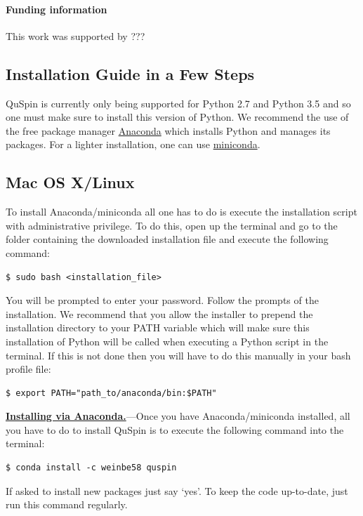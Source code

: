 \documentclass{SciPost}
\newcommand\0{\scalebox{-1}[1]{0}}
\let\svttfamily\ttfamily
\renewcommand\ttfamily{\svttfamily\catcode`0=\active }
\begin{document}
\paragraph{Funding information}
This work was supported by ???
\begin{appendix}
	
\section{Installation Guide in a Few Steps}
	\label{app:install}
	
	QuSpin is currently only being supported for Python 2.7 and Python 3.5 and so one must make sure to install this version of Python. We recommend the use of the free package manager \href{https://www.continuum.io/downloads}{Anaconda} which installs Python and manages its packages. For a lighter installation, one can use \href{http://conda.pydata.org/miniconda.html}{miniconda}.
	
	\subsection{Mac OS X/Linux}
	To install Anaconda/miniconda all one has to do is execute the installation script with administrative privilege. To do this, open up the terminal and go to the folder containing the downloaded installation file and execute the following command: 
	\begin{lstlisting}[numbers=none,keywordstyle=\ttfamily]
	$ sudo bash <installation_file>
	\end{lstlisting}
	You will be prompted to enter your password. Follow the prompts of the installation. We recommend that you allow the installer to prepend the installation directory to your PATH variable which will make sure this installation of Python will be called when executing a Python script in the terminal. If this is not done then you will have to do this manually in your bash profile file:
	\begin{lstlisting}[numbers=none,keywordstyle=\ttfamily]
	$ export PATH="path_to/anaconda/bin:$PATH"
	\end{lstlisting}
	
	\underline{\bf Installing via Anaconda.}---Once you have Anaconda/miniconda installed, all you have to do to install QuSpin is to execute the following command into the terminal: 
	\begin{lstlisting}[numbers=none,keywordstyle=\ttfamily]
	$ conda install -c weinbe58 quspin
	\end{lstlisting}
	If asked to install new packages just say `yes'. To keep the code up-to-date, just run this command regularly. 
	

\end{appendix}
\end{document}
